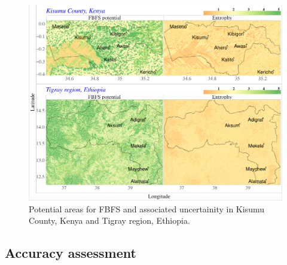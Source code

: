 \documentclass[]{elsarticle} %
\begin{document}
\begin{figure}[!h]

{\centering \includegraphics[width=1\linewidth,]{figures/FBFS_plot} 

}

\caption{Potential areas for FBFS and associated uncertainity in Kisumu County, Kenya and Tigray region, Ethiopia.}\label{fig:fig9}
\end{figure}

\begin{table}

\caption{\label{tab:tab5}Spatial coverage of FBFS in Kisumu County, Kenya and Tigray region, Ethiopia.}
\centering
{}
\end{table}

\hypertarget{section_3_4}{%
\subsection{Accuracy assessment}\label{section_3_4}}
\end{document}
